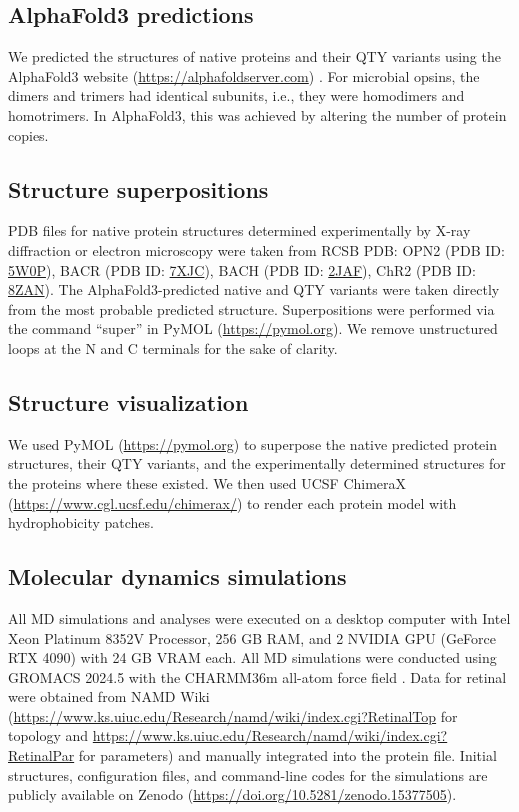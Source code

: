\documentclass[fleqn, 10pt]{manuscript}
\begin{document}
\subsection*{AlphaFold3 predictions}

We predicted the structures of native proteins and their QTY variants using the AlphaFold3 website (\url{https://alphafoldserver.com}) \citep{Abramson_2024}. For microbial opsins, the dimers and trimers had identical subunits, i.e., they were homodimers and homotrimers. In AlphaFold3, this was achieved by altering the number of protein copies. 

\subsection*{Structure superpositions}

PDB files for native protein structures determined experimentally by X-ray diffraction or electron microscopy were taken from RCSB PDB: OPN2 (PDB ID: \href{https://www.rcsb.org/structure/5W0P}{5W0P}), BACR (PDB ID: \href{https://www.rcsb.org/structure/7XJC}{7XJC}), BACH (PDB ID: \href{https://www.rcsb.org/structure/2JAF}{2JAF}), ChR2 (PDB ID: \href{https://www.rcsb.org/structure/8ZAN}{8ZAN}). The AlphaFold3-predicted native and QTY variants were taken directly from the most probable predicted structure. Superpositions were performed via the command ``super'' in PyMOL (\url{https://pymol.org}). We remove unstructured loops at the N and C terminals for the sake of clarity. 

\subsection*{Structure visualization}

We used PyMOL (\url{https://pymol.org}) to superpose the native predicted protein structures, their QTY variants, and the experimentally determined structures for the proteins where these existed. We then used UCSF ChimeraX (\url{https://www.cgl.ucsf.edu/chimerax/}) to render each protein model with hydrophobicity patches.  

\subsection*{Molecular dynamics simulations}

All MD simulations and analyses were executed on a desktop computer with Intel Xeon Platinum 8352V Processor, 256 GB RAM, and 2 NVIDIA GPU (GeForce RTX 4090) with 24 GB VRAM each. All MD simulations were conducted using GROMACS 2024.5 \citep{Abraham_2015} with the CHARMM36m all-atom force field \citep{Huang_2017}. Data for retinal were obtained from NAMD Wiki (\url{https://www.ks.uiuc.edu/Research/namd/wiki/index.cgi?RetinalTop} for topology and \url{https://www.ks.uiuc.edu/Research/namd/wiki/index.cgi?RetinalPar} for parameters) and manually integrated into the protein file. Initial structures, configuration files, and command-line codes for the simulations are publicly available on Zenodo (\url{https://doi.org/10.5281/zenodo.15377505}). 
\end{document}
